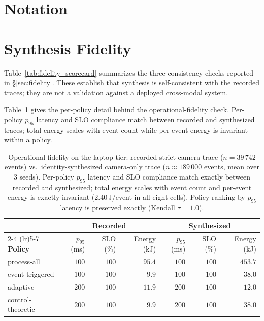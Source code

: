 \documentclass[conference]{IEEEtran}
\begin{document}
\section{Notation}

\clearpage

\section{Synthesis Fidelity}

Table~\ref{tab:fidelity_scorecard} summarizes the three consistency checks
reported in \S\ref{sec:fidelity}. These establish that synthesis is
self-consistent with the recorded traces; they are not a validation against a
deployed cross-modal system.



Table~\ref{tab:operational_fidelity} gives the per-policy detail behind the
operational-fidelity check. Per-policy $p_{95}$ latency and SLO compliance match
between recorded and synthesized traces; total energy scales with event count
while per-event energy is invariant within a policy.

\begin{table}[b]
\centering
\begin{tabular}{@{}l rrr rrr@{}}
\toprule
& \multicolumn{3}{c}{\textbf{Recorded}} & \multicolumn{3}{c}{\textbf{Synthesized}} \\
\cmidrule(lr){2-4} \cmidrule(lr){5-7}
\textbf{Policy} & $p_{95}$ (ms) & SLO (\%) & Energy (kJ) & $p_{95}$ (ms) & SLO (\%) & Energy (kJ) \\
\midrule
process-all & $100$ & $100$ & $95.4$ & $100$ & $100$ & $453.7$ \\
event-triggered & $100$ & $100$ & $9.9$ & $100$ & $100$ & $38.0$ \\
adaptive & $200$ & $100$ & $11.9$ & $200$ & $100$ & $12.0$ \\
control-theoretic & $200$ & $100$ & $9.9$ & $200$ & $100$ & $38.0$ \\
\bottomrule
\end{tabular}
\caption{Operational fidelity on the laptop tier: recorded strict camera trace
($n = 39\,742$ events) vs.\ identity-synthesized camera-only trace
($n \approx 189\,000$ events, mean over 3 seeds). Per-policy
$p_{95}$ latency and SLO compliance match exactly between recorded and
synthesized; total energy scales with event count and per-event energy is
exactly invariant ($2.40$\,J/event in all eight cells). Policy ranking by
$p_{95}$ latency is preserved exactly (Kendall $\tau = 1.0$).}
\label{tab:operational_fidelity}
\end{table}
\end{document}
